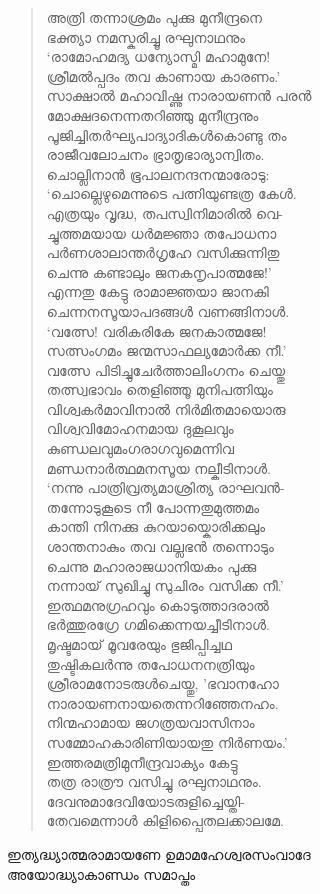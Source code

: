 \begin{verse}
അത്രി തന്നാശ്രമം പുക്കു മുനീന്ദ്രനെ\\
ഭക്ത്യാ നമസ്കരിച്ചൂ രഘുനാഥനും\\
‘രാമോഹമദ്യ ധന്യോസ്മി മഹാമുനേ!\\
ശ്രീമല്‍പ്പദം തവ കാണായ കാരണം.’\\
സാക്ഷാല്‍ മഹാവിഷ്ണു നാരായണന്‍ പരന്‍\\
മോക്ഷദനെന്നതറിഞ്ഞു മുനീന്ദ്രനും\\
പൂജിച്ചിതര്‍ഘ്യപാദ്യാദികള്‍കൊണ്ടു തം\\
രാജീവലോചനം ഭ്രാതൃഭാര്യാന്വിതം.\\
ചൊല്ലിനാന്‍ ഭൂപാലനന്ദനന്മാരോടു:\\
‘ചൊല്ലെഴുമെന്നുടെ പത്നിയുണ്ടത്ര കേള്‍.\\
എത്രയും വൃദ്ധ, തപസ്വിനിമാരില്‍ വെ-\\
ച്ചുത്തമയായ ധര്‍മജ്ഞാ തപോധനാ\\
പര്‍ണശാലാന്തര്‍ഗൃഹേ വസിക്കുന്നിതു\\
ചെന്നു കണ്ടാലും ജനകനൃപാത്മജേ!’\\
എന്നതു കേട്ടു രാമാജ്ഞയാ ജാനകി\\
ചെന്നനസൂയാപദങ്ങള്‍ വണങ്ങിനാള്‍.\\
‘വത്സേ! വരികരികേ ജനകാത്മജേ!\\
സത്സംഗമം ജന്മസാഫല്യമോര്‍ക്ക നീ.’\\
വത്സേ പിടിച്ചുചേര്‍ത്താലിംഗനം ചെയ്തു\\
തത്സ്വഭാവം തെളിഞ്ഞൂ മുനിപത്നിയും\\
വിശ്വകര്‍മാവിനാല്‍ നിര്‍മിതമായൊരു\\
വിശ്വവിമോഹനമായ ദുകൂലവും\\
കുണ്ഡലവുമംഗരാഗവുമെന്നിവ\\
മണ്ഡനാര്‍ത്ഥമനസൂയ നല്കീടിനാള്‍.\\
‘നന്നു പാത്രിവ്രത്യമാശ്രിത്യ രാഘവന്‍-\\
തന്നോടുകൂടെ നീ പോന്നതുമുത്തമം\\
കാന്തി നിനക്കു കുറയായ്കൊരിക്കലും\\
ശാന്തനാകും തവ വല്ലഭന്‍ തന്നൊടും\\
ചെന്നു മഹാരാജധാനിയകം പുക്കു\\
നന്നായ് സുഖിച്ചു സുചിരം വസിക്ക നീ.’\\
ഇത്ഥമനുഗ്രഹവും കൊടുത്താദരാല്‍\\
ഭര്‍ത്തുരഗ്രേ ഗമിക്കെന്നയച്ചീടിനാള്‍.\\
മൃഷ്ടമായ് മൂവരേയും ഭുജിപ്പിച്ചഥ\\
തുഷ്ടികലര്‍ന്നു തപോധനനത്രിയും\\
ശ്രീരാമനോടരുള്‍ചെയ്തു, ’ഭവാനഹോ\\
നാരായണനായതെന്നറിഞ്ഞേനഹം.\\
നിന്മഹാമായ ജഗത്രയവാസിനാം\\
സമ്മോഹകാരിണിയായതു നിര്‍ണയം.’\\
ഇത്തരമത്രിമുനീന്ദ്രവാക്യം കേട്ടു\\
തത്ര രാത്രൗ വസിച്ചു രഘുനാഥനും.\\
ദേവനുമാദേവിയോടരുളിച്ചെയ്തി-\\
തേവമെന്നാള്‍ കിളിപ്പൈതലക്കാലമേ.
\end{verse}

\begin{center}
ഇത്യദ്ധ്യാത്മരാമായണേ ഉമാമഹേശ്വരസംവാദേ\\
അയോദ്ധ്യാകാണ്ഡം സമാപ്തം
\end{center}

